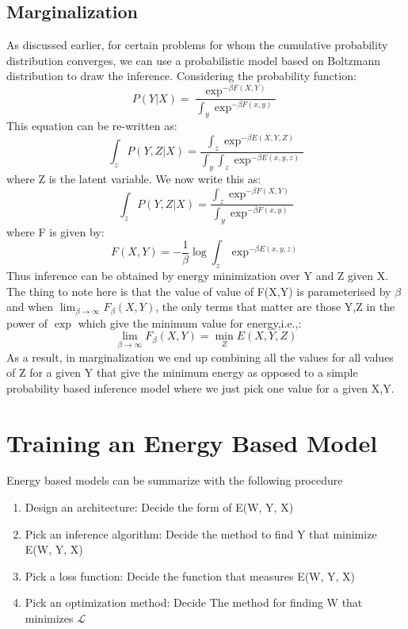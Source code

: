 \subsection{Marginalization}
As discussed earlier, for certain problems for whom the cumulative probability distribution converges,  we can use a probabilistic model based on Boltzmann distribution to draw the inference.
Considering the probability function:
\begin{equation}
    P(Y|X) = \dfrac{\exp^{-\beta F(X, Y)}}{\int_{y}\exp^{-\beta F(x,y)}}
\end{equation}
This equation can be re-written as:
\begin{equation}
    \int_{z}P(Y,Z|X) = \dfrac{\int_{z} \exp^{-\beta E(X,Y,Z)}}{\int_{y}\int_{z}\exp^{-\beta E(x,y,z)}}
\end{equation}
where Z is the latent variable. We now write this as:
\begin{equation}
    \int_{z}P(Y,Z|X) = \dfrac{\int_{z} \exp^{-\beta F(X,Y)}}{\int_{y}\exp^{-\beta F(x,y)}}
\end{equation}
where F is given by:
\begin{equation}
    F(X,Y) = -\dfrac{1}{\beta} \log \int_{z}\exp^{-\beta E(x,y,z)}
\end{equation}
Thus inference can be obtained by energy minimization over Y and Z given X.
The thing to note here is that the value of value of F(X,Y) is parameterised by $\beta$ and when $\lim_{\beta \to\infty} F_{\beta}(X,Y)$, the only terms that matter are those Y,Z in the power of $\exp$ which give the minimum value for energy,i.e.,:
\begin{equation}
    \lim_{\beta \to\infty} F_{\beta}(X,Y) = \min_{Z} E(X,Y,Z)
\end{equation}
As a result, in marginalization we end up combining all the values for all values of Z for a given Y that give the minimum energy as opposed to a simple probability based inference model where we just pick one value for a given X,Y.

\section{Training an Energy Based Model}

Energy based models can be summarize with the following procedure
\begin{enumerate}
    \item Design an architecture: Decide the form of E(W, Y, X)
    \item Pick an inference algorithm: Decide the method to find Y that minimize E(W, Y, X)
    \item Pick a loss function: Decide the function that measures E(W, Y, X)
    \item Pick an optimization method: Decide The method for finding W that minimizes $\mathcal{L}$
\end{enumerate} 

